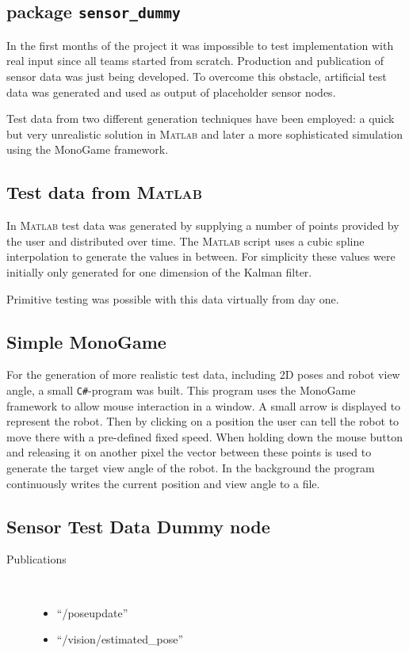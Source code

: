 \subsection{package \texttt{sensor\_dummy}}
In the first months of the project it was impossible to test implementation with real input since all teams started from scratch. Production and publication of sensor data was just being developed. To overcome this obstacle, artificial test data was generated and used as output of placeholder sensor nodes. 

Test data from two different generation techniques have been employed: a quick but very unrealistic solution in \textsc{Matlab} and later a more sophisticated simulation using the MonoGame framework.

\subsection{Test data from \textsc{Matlab}}
In \textsc{Matlab} test data was generated by supplying a number of points provided by the user and distributed over time. The \textsc{Matlab} script uses a cubic spline interpolation to generate the values in between. For simplicity these values were initially only generated for one dimension of the Kalman filter.

Primitive testing was possible with this data virtually from day one.

\subsection{Simple MonoGame}
For the generation of more realistic test data, including 2D poses and robot view angle, a small \texttt{C\#}-program was built. This program uses the MonoGame framework to allow mouse interaction in a window. A small arrow is displayed to represent the robot. Then by clicking on a position the user can tell the robot to move there with a pre-defined fixed speed. When holding down the mouse button and releasing it on another pixel the vector between these points is used to generate the target view angle of the robot. In the background the program continuously writes the current position and view angle to a file.

\subsection{Sensor Test Data Dummy node}
\begin{description}
\item[Publications]\
	\begin{itemize}
	\item ``/poseupdate''
	\item ``/vision/estimated\_pose''
	\end{itemize}
\end{description}

